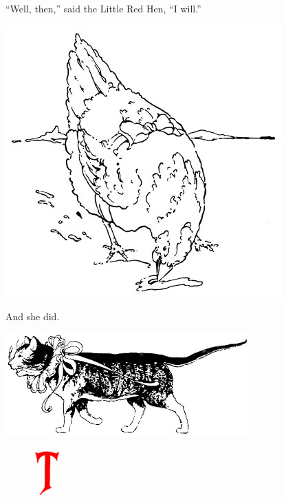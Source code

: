 \documentclass[letterpaper, 10pt, openany]{memoir}
\begin{document}
\newpage
``Well, then,'' said the Little Red Hen, ``I will.''

\begin{center}
	\includegraphics[width=\textwidth]{image_015.jpg}
\end{center}

And she did.

\newpage
\begin{center}
	\includegraphics[width=0.7\textwidth]{image_016_1.jpg}
\end{center}

\begin{figure}
	\vspace{-1.25\onelineskip}
	\includegraphics[width=0.1\textwidth]{image_016_2.jpg}
\end{figure}
\end{document}

